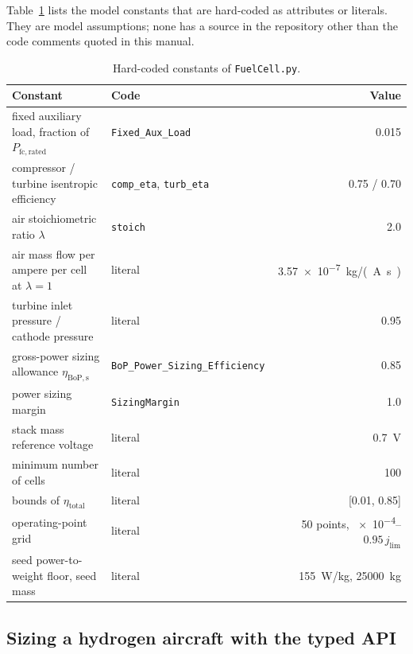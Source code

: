 \documentclass[a4paper,11pt]{article}
\newcommand{\code}[1]{\nolinkurl{#1}}
\newcommand{\fn}[1]{\nolinkurl{#1}}
\begin{document}
Table~\ref{tab:constants} lists the model constants that are hard-coded as attributes or
literals. They are model assumptions; none has a source in the repository other than the code
comments quoted in this manual.

\begin{table}[ht]
\centering\small
\caption{Hard-coded constants of \fn{FuelCell.py}.}
\label{tab:constants}
\setlength{\tabcolsep}{4pt}
\begin{tabular}{@{}llr@{}}
\toprule
Constant & Code & Value \\
\midrule
fixed auxiliary load, fraction of $P_\mathrm{fc,rated}$ & \code{Fixed_Aux_Load} & 0.015 \\
compressor / turbine isentropic efficiency & \code{comp_eta}, \code{turb_eta} & 0.75 / 0.70 \\
air stoichiometric ratio $\lambda$ & \code{stoich} & 2.0 \\
air mass flow per ampere per cell at $\lambda=1$ & literal & \SI{3.57e-7}{kg/(A.s)} \\
turbine inlet pressure / cathode pressure & literal & 0.95 \\
gross-power sizing allowance $\eta_\mathrm{BoP,s}$ & \code{BoP_Power_Sizing_Efficiency} & 0.85 \\
power sizing margin & \code{SizingMargin} & 1.0 \\
stack mass reference voltage & literal & \SI{0.7}{V} \\
minimum number of cells & literal & 100 \\
bounds of $\eta_\mathrm{total}$ & literal & [0.01, 0.85] \\
operating-point grid & literal & 50 points, \SI{e-4}{}--$0.95\,j_\mathrm{lim}$ \\
seed power-to-weight floor, seed mass & literal & \SI{155}{W/kg}, \SI{25000}{kg} \\
\bottomrule
\end{tabular}
\end{table}

\subsection{Sizing a hydrogen aircraft with the typed API}
\end{document}
